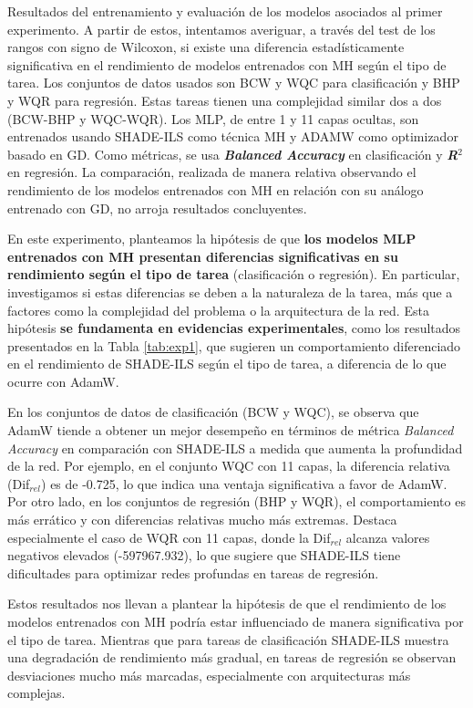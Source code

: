\begin{table}[]
\caption[Resultados del entrenamiento y evaluación de los modelos asociados al primer experimento]{Resultados del entrenamiento y evaluación de los modelos asociados al primer experimento. A partir de estos, intentamos averiguar, a través del test de los rangos con signo de Wilcoxon, si existe una diferencia estadísticamente significativa en el rendimiento de modelos entrenados con MH según el tipo de tarea. Los conjuntos de datos usados son BCW y WQC para clasificación y BHP y WQR para regresión. Estas tareas tienen una complejidad similar dos a dos (BCW-BHP y WQC-WQR). Los MLP, de entre 1 y 11 capas ocultas, son entrenados usando SHADE-ILS como técnica MH y ADAMW como optimizador basado en GD. Como métricas, se usa \textbf{\textit{Balanced Accuracy}} en clasificación y \emph{\textbf{R$^2$}} en regresión. La comparación, realizada de manera relativa observando el rendimiento de los modelos entrenados con MH en relación con su análogo entrenado con GD, no arroja resultados concluyentes.}
\label{tab:exp1}
\end{table}

En este experimento, planteamos la hipótesis de que \textbf{los modelos MLP entrenados con MH presentan diferencias significativas en su rendimiento según el tipo de tarea} (clasificación o regresión). En particular, investigamos si estas diferencias se deben a la naturaleza de la tarea, más que a factores como la complejidad del problema o la arquitectura de la red. Esta hipótesis \textbf{se fundamenta en evidencias experimentales}, como los resultados presentados en la Tabla \ref{tab:exp1}, que sugieren un comportamiento diferenciado en el rendimiento de SHADE-ILS según el tipo de tarea, a diferencia de lo que ocurre con AdamW.

En los conjuntos de datos de clasificación (BCW y WQC), se observa que AdamW tiende a obtener un mejor desempeño en términos de métrica \textit{Balanced Accuracy} en comparación con SHADE-ILS a medida que aumenta la profundidad de la red. Por ejemplo, en el conjunto WQC con 11 capas, la diferencia relativa (Dif$_{rel}$) es de -0.725, lo que indica una ventaja significativa a favor de AdamW. Por otro lado, en los conjuntos de regresión (BHP y WQR), el comportamiento es más errático y con diferencias relativas mucho más extremas. Destaca especialmente el caso de WQR con 11 capas, donde la Dif$_{rel}$ alcanza valores negativos elevados (-597967.932), lo que sugiere que SHADE-ILS tiene dificultades para optimizar redes profundas en tareas de regresión.

Estos resultados nos llevan a plantear la hipótesis de que el rendimiento de los modelos entrenados con MH podría estar influenciado de manera significativa por el tipo de tarea. Mientras que para tareas de clasificación SHADE-ILS muestra una degradación de rendimiento más gradual, en tareas de regresión se observan desviaciones mucho más marcadas, especialmente con arquitecturas más complejas.


